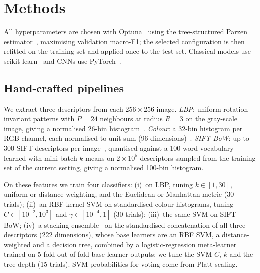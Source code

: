 \section{Methods}
\label{sec:methods}

All hyperparameters are chosen with Optuna~\cite{akiba2019optuna} using the tree-structured Parzen estimator~\cite{bergstra2011tpe}, maximising validation macro-F1; the selected configuration is then refitted on the training set and applied once to the test set.
Classical models use scikit-learn~\cite{pedregosa2011sklearn} and CNNs use PyTorch~\cite{paszke2019pytorch}.

\subsection{Hand-crafted pipelines}
\label{sec:classical}
We extract three descriptors from each $256\times256$ image.
\emph{LBP}: uniform rotation-invariant patterns with $P{=}24$ neighbours at radius $R{=}3$ on the gray-scale image, giving a normalised 26-bin histogram~\cite{ojala2002lbp}.
\emph{Colour}: a 32-bin histogram per RGB channel, each normalised to unit sum (96 dimensions)~\cite{swain1991color}.
\emph{SIFT-BoW}: up to 300 SIFT descriptors per image~\cite{lowe2004sift}, quantised against a 100-word vocabulary learned with mini-batch $k$-means on $2\times10^5$ descriptors sampled from the training set of the current setting, giving a normalised 100-bin histogram.

On these features we train four classifiers:
(i)~\knn on LBP, tuning $k\in[1,30]$, uniform or distance weighting, and the Euclidean or Manhattan metric (30 trials);
(ii)~an RBF-kernel SVM on standardised colour histograms, tuning $C\in[10^{-2},10^{3}]$ and $\gamma\in[10^{-4},1]$ (30 trials);
(iii)~the same SVM on SIFT-BoW;
(iv)~a stacking ensemble~\cite{wolpert1992stacked} on the standardised concatenation of all three descriptors (222 dimensions), whose base learners are an RBF SVM, a distance-weighted \knn and a decision tree, combined by a logistic-regression meta-learner trained on 5-fold out-of-fold base-learner outputs; we tune the SVM $C$, $k$ and the tree depth (15 trials).
SVM probabilities for voting come from Platt scaling.

